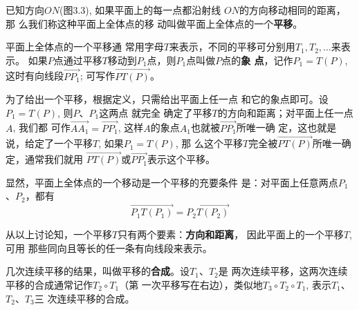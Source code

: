 已知方向$ON$(图3.3), 如果平面上的每一点都沿射线
$ON$的方向移动相同的距离，那
么我们称这种平面上全体点的移
动叫做平面上全体点的一个\textbf{平移}。

\begin{figure}[htp]\centering
    \begin{minipage}[t]{0.48\textwidth}
    \centering
{}
    \caption{}
    \end{minipage}
    \begin{minipage}[t]{0.48\textwidth}
    \centering
    \caption{}
    \end{minipage}
    \end{figure}

平面上全体点的一个平移通
常用字母$T$来表示，不同的平移可分别用$T_1,T_2,\ldots$来表示。
如果$P$点通过平移$T$移动到$P_1$点，则$P_1$点叫做$P$点的\textbf{象
点}，记作$P_1=T(P)$, 这时有向线段$\Vec{PP_1}$; 可写作$\Vec{PT(P)}$。

为了给出一个平移，根据定义，只需给出平面上任一点
和它的象点即可。设$P_1=T(P)$, 则$P$、$P_1$这两点 就完全
确定了平移$T$的方向和距离；对平面上任一点$A$, 我们都
可作$\Vec{AA_1}=\Vec{PP_1}$, 这样$A$的象点$A_1$也就被$\Vec{PP_1}$所唯一确
定，这也就是说，给定了一个平移$T$, 如果$P_1=T(P)$, 那
么这个平移$T$完全被$\Vec{PT(P)}$所唯一确定，通常我们就用
$\Vec{PT(P)}$或$\Vec{PP_1}$表示这个平移。

显然，平面上全体点的一个移动是一个平移的充要条件
是：对平面上任意两点$P_1$、$P_2$，都有
\[\Vec{P_1T(P_1)}=\Vec{P_2T(P_2)}\]

从以上讨论知，一个平移$T$只有两个要素：\textbf{方向和距离}，
因此平面上的一个平移$T$, 可用
那些同向且等长的任一条有向线段来表示。

几次连续平移的结果，叫做平移的\textbf{合成}。设$T_1$、$T_2$是
两次连续平移，这两次连续平移的合成通常记作$T_2\circ T_1$（第
一次平移写在右边），类似地$T_3\circ T_2\circ T_1$, 表示$T_1$、$T_2$、$T_3$三
次连续平移的合成。

